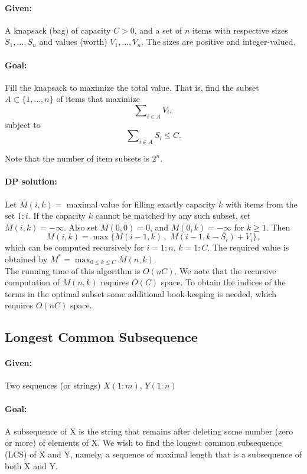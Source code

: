\paragraph{Given:}   A knapsack (bag) of capacity $C > 0$, and a set of $n$ items with respective sizes ${S_1}, \ldots ,{S_n}$ and values (worth) ${V_1}, \ldots ,{V_n}$. The sizes are positive and integer-valued.
\paragraph{Goal:}  Fill the knapsack to maximize the total value. That is, find the subset $A \subset \{ 1, \ldots ,n\} $ of items that maximize \[\sum\nolimits_{i \in A} {{V_i}} ,\] subject to  \[\sum\nolimits_{i \in A} {{S_i}}  \le C.\]

Note that the number of item subsets is ${2^n}$.

\paragraph{DP solution:}
Let $M(i,k) = $ maximal value for filling exactly capacity $k$ with items from the set $1:i$.
If the capacity $k$ cannot be matched by any such subset, set $M(i,k) =  - \infty $.
Also set $M(0,0) = 0$, and  $M(0,k) =  - \infty $ for $k \ge 1$.  Then
$$M(i,k) = \max \{ M(i - 1,k)\,,\,\,M(i - 1,k - {S_i}) + {V_i}\} ,$$
which can be computed recursively for $i = 1:n$,  $k = 1:C$. The required value is obtained by    $M^* = {\max _{0 \le k \le C}}M(n,k)$.
\\
The running time of this algorithm is $O(nC)$.  We note that the recursive computation of $M(n,k)$ requires $O(C)$ space. To obtain the indices of the terms in the optimal subset some additional book-keeping is needed, which requires $O(nC)$  space.

\subsection{Longest Common Subsequence}\label{ss:LCS}
\paragraph{Given: } Two sequences (or strings) $X(1:m)$, $Y(1:n)$
\paragraph{Goal:}   A subsequence of X is the string that remains after deleting some number (zero or more) of elements of X.  We wish to find the longest common subsequence (LCS) of X and Y, namely, a sequence of maximal length that is a subsequence of both X and Y.

